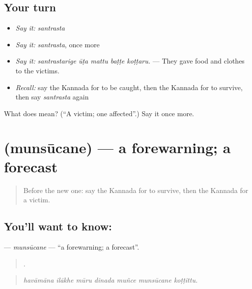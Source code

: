 \subsection*{Your turn}
\begin{itemize}
\raggedright
  \item \emph{Say it:} \emph{santrasta}
  \item \emph{Say it:} \emph{santrasta}, once more
  \item \emph{Say it:} \emph{santrastarige ūṭa mattu baṭṭe koṭṭaru.} — They gave food and clothes to the victims.
  \item \emph{Recall:} say the Kannada for to be caught, then the Kannada for to survive, then say \emph{santrasta} again
\end{itemize}

\begin{tcolorbox}[breakable,colback=teal!4,colframe=teal!35!black,title={Before you move on}]
What does  mean? (\textquotedblleft{}A victim; one affected\textquotedblright{}.) Say it once more.
\end{tcolorbox}
\section[\texorpdfstring{\kn{ಮುನ್ಸೂಚನೆ} (munsūcane)}{ಮುನ್ಸೂಚನೆ (munsūcane)}]{ (munsūcane) — a forewarning; a forecast}

\label{lesson:KA-C332-munsucane}



\begin{quote}
Before the new one: say the Kannada for to survive, then the Kannada for a victim.
\end{quote}

\subsection*{You'll want to know: }
\textbf{} — \emph{munsūcane} — \textquotedblleft{}a forewarning; a forecast\textquotedblright{}.

\begin{quote}
      .
\end{quote}

\begin{quote}
\emph{havāmāna ilākhe mūru dinada muñce munsūcane koṭṭittu.}
\end{quote}

